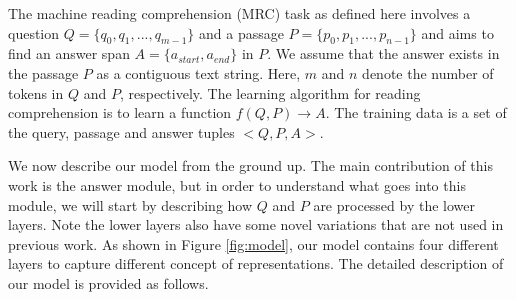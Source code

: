 \documentclass[11pt,a4paper]{article}
\newcommand\DR{SAN }
\begin{document}
\begin{figure*}[h!]
\centering
{}
\caption{\label{fig:model} {\bf Architecture of the \DR for Reading Comprehension:} The first layer is a lexicon encoding layer that maps words to their embeddings independently for the question (left) and the passage (right): this is a concatenation of word embeddings, POS embeddings, etc. followed by a position-wise FFN. The next layer is a context encoding layer, where a BiLSTM is used on the top of the lexicon embedding layer to obtain the context representation for both question and passage. In order to reduce the parameters, a maxout layer is applied on the output of BiLSTM. The third layer is the working memory: First we compute an alignment matrix between the question and passage using an attention mechanism, and use this to derive a question-aware passage representation. Then we concatenate this with the context representation of passage and the word embedding, and employ a self attention layer to re-arrange the information gathered. Finally, we use another LSTM to generate a working memory for the passage. At last, the fourth layer is the answer module, which is a GRU that outputs predictions at each state $s_t$.}
\end{figure*}

The machine reading comprehension (MRC) task as defined here involves a question $Q=\{q_0, q_1, ..., q_{m-1}\}$ and a passage $P=\{p_0, p_1, ..., p_{n-1}\}$ 
and aims to find an answer span $A=\{a_{start}, a_{end}\}$ in $P$. 
We assume that the answer exists in the passage $P$ as a contiguous text string. 
Here, $m$ and $n$ denote the number of tokens in $Q$ and $P$, respectively. 
The learning algorithm for reading comprehension is to learn a function $f(Q, P) \rightarrow A$. 
The training data is a set of the query, passage and answer tuples $<Q, P, A>$. 

We now describe our model from the ground up. The main contribution of this work is the answer module, but in order to understand what goes into this module, we will start by describing how $Q$ and $P$ are processed by the lower layers. Note the lower layers also have some novel variations that are not used in previous work. 
As shown in Figure \ref{fig:model}, our model contains four different layers to capture different concept of representations.
The detailed description of our model is provided as follows.
\end{document}
